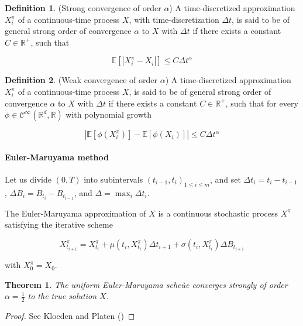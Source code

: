 \documentclass[english,11pt,openany]{report}
\theoremstyle{definition}
\newtheorem{defn}{Definition}[section]
\newcommand{\E}{\mathbb{E}}
\newcommand{\R}{\mathbb{R}}
\theoremstyle{plain}
\newtheorem{Th}{Theorem}[section]
\theoremstyle{definition}
\begin{document}
\begin{defn}
	(Strong convergence of order $\alpha$)
	A time-discretized approximation $X_i^\pi$ of a continuous-time process $X$, with time-discretization $\Delta t$, is said to be of general strong order of convergence $\alpha$ to $X$ with $\Delta t$ if there exists a constant $C\in\mathbb{R^+}$, such that
	
	$$ \E[|X_i^\pi - X_i|] \leq C \Delta t^\alpha $$

	
\end{defn}

\begin{defn}
	(Weak convergence of order $\alpha$)
	A time-discretized approximation $X_i^\pi$ of a continuous-time process $X$, is said to be of general strong order of convergence $\alpha$ to $X$ with $\Delta t$ if there exists a constant $C\in\mathbb{R^+}$, such that for every $\phi \in \mathcal{C}^\infty(\R^d, \R)$ with polynomial growth
	
	$$ |\E[\phi(X_i^\pi)] - \E[\phi(X_i)]| \leq C \Delta t^\alpha $$
	
\end{defn}


\paragraph{Euler-Maruyama method}

Let us divide $(0,T)$ into subintervals $(t_{i - 1}, t_i)_{1 \leq i \leq m}$, and set $\Delta t_i = t_i - t_{i - 1}$, $\Delta B_i = B_{t_i} - B_{t_{i - 1}} $, and $\Delta = \max_i \Delta t_i$.

The Euler-Maruyama approximation of $X$ is a continuous stochastic process $X^\pi$ satisfying the iterative scheme

$$X^\pi_{t_{i + 1}} =  X^\pi_{t_i} + \mu(t_i,X^\pi_{t_i})\Delta t_{i + 1} + \sigma (t_i, X^\pi_{t_i}) \Delta B_{t_{i + 1}}$$

with $X^\pi_0 = X_0$.

\begin{Th}
	The uniform Euler-Maruyama scheùe converges strongly of order $\alpha = \frac{1}{2}$ to the true solution $X$.
\end{Th}

\begin{proof}
	See Kloeden and Platen (\cite{kloeden2012numerical})
\end{proof}
\end{document}
